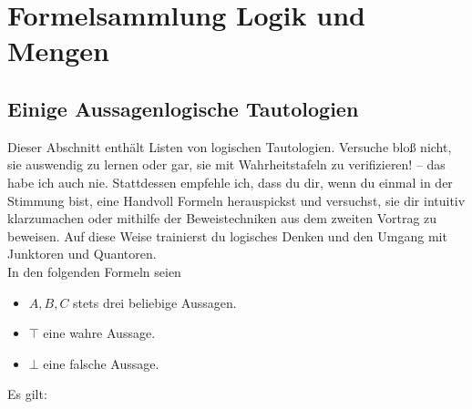 

\chapter{Formelsammlung Logik und Mengen} \label{formelsammlung}


\section{Einige Aussagenlogische Tautologien}
Dieser Abschnitt enthält Listen von logischen Tautologien. Versuche bloß nicht, sie auswendig zu lernen oder gar, sie mit Wahrheitstafeln zu verifizieren! -- das habe ich auch nie. Stattdessen empfehle ich, dass du dir, wenn du einmal in der Stimmung bist, eine Handvoll Formeln herauspickst und versuchst, sie dir intuitiv klarzumachen oder mithilfe der Beweistechniken aus dem zweiten Vortrag zu beweisen. Auf diese Weise trainierst du logisches Denken und den Umgang mit Junktoren und Quantoren. \\[0.5em]
In den folgenden Formeln seien
\begin{itemize}
    \item $A,B,C$ stets drei beliebige Aussagen.
    \item $\top$ eine wahre Aussage.
    \item $\bot$ eine falsche Aussage.
\end{itemize}
Es gilt:
\begingroup
\allowdisplaybreaks
